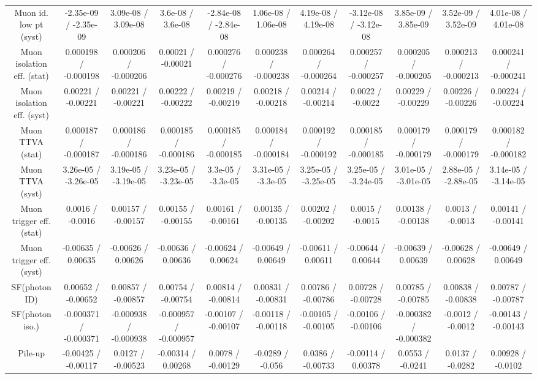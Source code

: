 \begin{table}[htbp]
\begin{center}
\begin{tabular}{|c|c|c|c|c|c|c|c|c|c|c|}
  Muon id. low pt (syst) & -2.35e-09 / -2.35e-09 & 3.09e-08 / 3.09e-08 & 3.6e-08 / 3.6e-08 & -2.84e-08 / -2.84e-08 & 1.06e-08 / 1.06e-08 & 4.19e-08 / 4.19e-08 & -3.12e-08 / -3.12e-08 & 3.85e-09 / 3.85e-09 & 3.52e-09 / 3.52e-09 & 4.01e-08 / 4.01e-08 \\ 
  Muon isolation eff. (stat) & 0.000198 / -0.000198 & 0.000206 / -0.000206 & 0.00021 / -0.00021 & 0.000276 / -0.000276 & 0.000238 / -0.000238 & 0.000264 / -0.000264 & 0.000257 / -0.000257 & 0.000205 / -0.000205 & 0.000213 / -0.000213 & 0.000241 / -0.000241 \\ 
  Muon isolation eff. (syst) & 0.00221 / -0.00221 & 0.00221 / -0.00221 & 0.00222 / -0.00222 & 0.00219 / -0.00219 & 0.00218 / -0.00218 & 0.00214 / -0.00214 & 0.0022 / -0.0022 & 0.00229 / -0.00229 & 0.00226 / -0.00226 & 0.00224 / -0.00224 \\ 
  Muon TTVA (stat) & 0.000187 / -0.000187 & 0.000186 / -0.000186 & 0.000185 / -0.000186 & 0.000185 / -0.000185 & 0.000184 / -0.000184 & 0.000192 / -0.000192 & 0.000185 / -0.000185 & 0.000179 / -0.000179 & 0.000179 / -0.000179 & 0.000182 / -0.000182 \\ 
  Muon TTVA (syst) & 3.26e-05 / -3.26e-05 & 3.19e-05 / -3.19e-05 & 3.23e-05 / -3.23e-05 & 3.3e-05 / -3.3e-05 & 3.31e-05 / -3.3e-05 & 3.25e-05 / -3.25e-05 & 3.25e-05 / -3.24e-05 & 3.01e-05 / -3.01e-05 & 2.88e-05 / -2.88e-05 & 3.14e-05 / -3.14e-05 \\ 
  Muon trigger eff. (stat) & 0.0016 / -0.0016 & 0.00157 / -0.00157 & 0.00155 / -0.00155 & 0.00161 / -0.00161 & 0.00135 / -0.00135 & 0.00202 / -0.00202 & 0.0015 / -0.0015 & 0.00138 / -0.00138 & 0.0013 / -0.0013 & 0.00141 / -0.00141 \\ 
  Muon trigger eff. (syst) & -0.00635 / 0.00635 & -0.00626 / 0.00626 & -0.00636 / 0.00636 & -0.00624 / 0.00624 & -0.00649 / 0.00649 & -0.00611 / 0.00611 & -0.00644 / 0.00644 & -0.00639 / 0.00639 & -0.00628 / 0.00628 & -0.00649 / 0.00649 \\ 
  SF(photon ID) & 0.00652 / -0.00652 & 0.00857 / -0.00857 & 0.00754 / -0.00754 & 0.00814 / -0.00814 & 0.00831 / -0.00831 & 0.00786 / -0.00786 & 0.00728 / -0.00728 & 0.00785 / -0.00785 & 0.00838 / -0.00838 & 0.00787 / -0.00787 \\ 
  SF(photon iso.) & -0.000371 / -0.000371 & -0.000938 / -0.000938 & -0.000957 / -0.000957 & -0.00107 / -0.00107 & -0.00118 / -0.00118 & -0.00105 / -0.00105 & -0.00106 / -0.00106 & -0.000382 / -0.000382 & -0.0012 / -0.0012 & -0.00143 / -0.00143 \\ 
  Pile-up & -0.00425 / -0.00117 & 0.0127 / -0.00523 & -0.00314 / 0.00268 & 0.0078 / -0.00129 & -0.0289 / -0.056 & 0.0386 / -0.00733 & -0.00114 / 0.00378 & 0.0553 / -0.0241 & 0.0137 / -0.0282 & 0.00928 / -0.0102 \\ 

\end{tabular}
\end{center}
\end{table}
